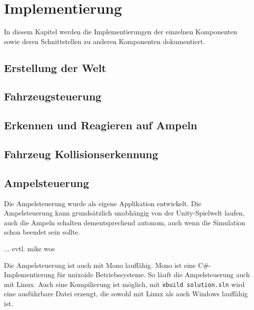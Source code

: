 
\chapter{Implementierung}
\label{Implementierung}

In diesem Kapitel werden die Implementierungen der einzelnen Komponenten sowie deren Schnittstellen zu anderen Komponenten dokumentiert.

\thispagestyle{standard}
\pagestyle{standard}

\section{Erstellung der Welt}
\label{Erstellung_der_Welt}

\section{Fahrzeugsteuerung}
\label{Fahrzeugsteuerung}

\section{Erkennen und Reagieren auf Ampeln}
\label{Erkennen_und_Reagieren_auf_Ampeln}

\section{Fahrzeug Kollisionserkennung}
\label{Fahrzeug_Kollisionserkennung}


\section{Ampelsteuerung}
\label{Ampelsteuerung}

Die Ampelsteuerung wurde als eigene Applikation entwickelt. Die Ampelsteuerung kann grundsätzlich unabhängig von der Unity-Spielwelt laufen, auch die Ampeln schalten dementsprechend autonom, auch wenn die Simulation schon beendet sein sollte.

... evtl. mike wos


Die Ampelsteuerung ist auch mit Mono lauffähig. Mono ist eine C\#-Implementierung für unixoide Betriebssysteme. So läuft die Ampelsteuerung auch mit Linux. Auch eine Kompilierung ist möglich, mit \texttt{xbuild solution.sln} wird eine ausführbare Datei erzeugt, die sowohl mit Linux als auch Windows lauffähig ist.

